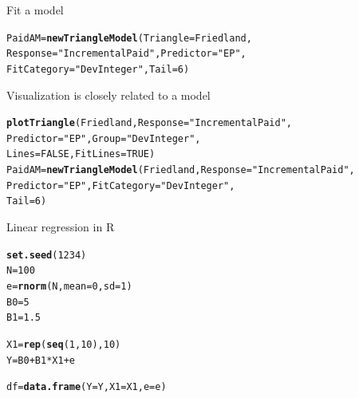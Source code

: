 \documentclass[xcolor=dvipsnames]{beamer}\usepackage{graphicx, color}
\makeatletter
\newcommand{\hlfunctioncall}[1]{\textcolor[rgb]{0.501960784313725,0,0.329411764705882}{\textbf{#1}}}%
\newcommand{\hlstring}[1]{\textcolor[rgb]{0.6,0.6,1}{#1}}%
\newenvironment{kframe}{%
 \def\at@end@of@kframe{}%
 \ifinner\ifhmode%
  \def\at@end@of@kframe{\end{minipage}}%
  \begin{minipage}{\columnwidth}%
 \fi\fi%
 \def\FrameCommand##1{\hskip\@totalleftmargin \hskip-\fboxsep
 \colorbox{shadecolor}{##1}\hskip-\fboxsep
     \hskip-\linewidth \hskip-\@totalleftmargin \hskip\columnwidth}%
 \MakeFramed {\advance\hsize-\width
   \@totalleftmargin\z@ \linewidth\hsize
   \@setminipage}}%
 {\par\unskip\endMakeFramed%
 \at@end@of@kframe}
\newenvironment{knitrout}{}{} %
\makeatother
\begin{document}
\begin{frame}[fragile]{Fit a model}
\begin{knitrout}
\color{fgcolor}\begin{kframe}
\begin{alltt}
PaidAM = \hlfunctioncall{newTriangleModel}(Triangle = Friedland, 
    Response = \hlstring{"IncrementalPaid"}, Predictor = \hlstring{"EP"}, 
    FitCategory = \hlstring{"DevInteger"}, Tail = 6)
\end{alltt}
\end{kframe}
\end{knitrout}

\end{frame}

\begin{frame}[fragile]{Visualization is closely related to a model}
\begin{knitrout}
\color{fgcolor}\begin{kframe}
\begin{alltt}
\hlfunctioncall{plotTriangle}(Friedland, Response = \hlstring{"IncrementalPaid"}, 
    Predictor = \hlstring{"EP"}, Group = \hlstring{"DevInteger"}, 
    Lines = FALSE, FitLines = TRUE)
PaidAM = \hlfunctioncall{newTriangleModel}(Friedland, Response = \hlstring{"IncrementalPaid"}, 
    Predictor = \hlstring{"EP"}, FitCategory = \hlstring{"DevInteger"}, 
    Tail = 6)
\end{alltt}
\end{kframe}
\end{knitrout}

\end{frame}

\begin{frame}[fragile]{Linear regression in R}
\begin{knitrout}
\color{fgcolor}\begin{kframe}
\begin{alltt}
\hlfunctioncall{set.seed}(1234)
N = 100
e = \hlfunctioncall{rnorm}(N, mean = 0, sd = 1)
B0 = 5
B1 = 1.5

X1 = \hlfunctioncall{rep}(\hlfunctioncall{seq}(1, 10), 10)
Y = B0 + B1 * X1 + e

df = \hlfunctioncall{data.frame}(Y = Y, X1 = X1, e = e)
\end{alltt}
\end{kframe}
\end{knitrout}

\end{frame}
\end{document}
